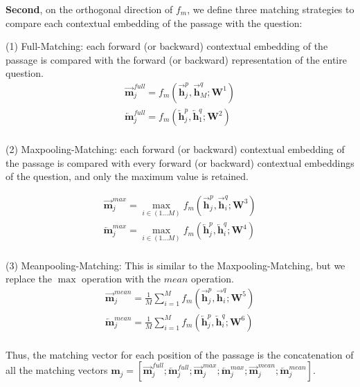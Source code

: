 \documentclass[11pt,letterpaper]{article}
\begin{document}
\textbf{Second}, on the orthogonal direction of $f_{m}$, 
we define three matching strategies to compare each contextual embedding of the passage with the question:

(1) Full-Matching: each forward (or backward) contextual embedding of the passage is compared with the forward (or backward) representation of the entire question.
\begin{equation}
\begin{split}
\overrightarrow{\bm{m}}^{full}_j = f_{m}(\overrightarrow{\bm{h}}_j^p, \overrightarrow{\bm{h}}_M^q;\bm{W}^1) \\
\overleftarrow{\bm{m}}^{full}_j = f_{m}(\overleftarrow{\bm{h}}_j^p, \overleftarrow{\bm{h}}_1^q;\bm{W}^2) \\
\label{equ:FullM}
\end{split}
\end{equation}
 

(2) Maxpooling-Matching: each forward (or backward) contextual embedding of the passage is compared with every forward (or backward) contextual embeddings of the question, and only the maximum value is retained.

\begin{equation}
\begin{split}
\overrightarrow{\bm{m}}^{max}_j = \max_{i \in (1 ... M)} f_{m}(\overrightarrow{\bm{h}}_j^p, \overrightarrow{\bm{h}}_i^q;\bm{W}^3) \\
\overleftarrow{\bm{m}}^{max}_j = \max_{i \in (1 ... M)} f_{m}(\overleftarrow{\bm{h}}_j^p, \overleftarrow{\bm{h}}_i^q;\bm{W}^4) \\
\label{equ:MaxM}
\end{split}
\end{equation}
 

(3) Meanpooling-Matching: This is similar to the Maxpooling-Matching, but we replace the $\max$ operation with the $mean$ operation.
\begin{equation}
\begin{split}
\overrightarrow{\bm{m}}^{mean}_j = \frac{1}{M} \sum_{i=1}^M f_{m}(\overrightarrow{\bm{h}}_j^p, \overrightarrow{\bm{h}}_i^q;\bm{W}^5) \\
\overleftarrow{\bm{m}}^{mean}_j = \frac{1}{M} \sum_{i=1}^M f_{m}(\overleftarrow{\bm{h}}_j^p, \overleftarrow{\bm{h}}_i^q;\bm{W}^6) \\
\label{equ:MeanM}
\end{split}
\end{equation}

Thus, the matching vector for each position of the passage is the concatenation of all the matching vectors 
$\bm{m}_j=[\overrightarrow{\bm{m}}^{full}_j; \overleftarrow{\bm{m}}^{full}_j; \overrightarrow{\bm{m}}^{max}_j; \overleftarrow{\bm{m}}^{max}_j; \overrightarrow{\bm{m}}^{mean}_j; \overleftarrow{\bm{m}}^{mean}_j]$. 
\end{document}
